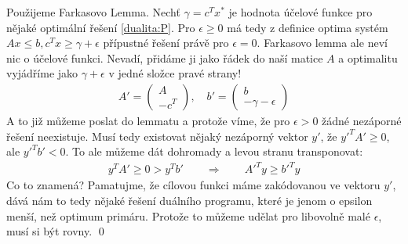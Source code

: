 \dk Použijeme Farkasovo Lemma. Nechť $\gamma = c^Tx^*$ je hodnota účelové funkce
pro nějaké optimální řešení \eqref{dualita:P}. Pro $\epsilon \geq 0$ má tedy z
definice optima systém $Ax \leq b, c^Tx \geq \gamma + \epsilon$ přípustné řešení právě pro
$\epsilon = 0$. Farkasovo lemma ale neví nic o účelové funkci. Nevadí, přidáme
ji jako řádek do naší matice $A$ a optimalitu vyjádříme jako $\gamma + \epsilon$
v jedné složce pravé strany!
\begin{align}
	A' = \left(\begin{array}{c} A \\ -c^T \end{array}\right), \quad b' =
	\left(\begin{array}{c} b \\ -\gamma - \epsilon\end{array}\right)
\end{align}
A to již můžeme poslat do lemmatu a protože víme, že pro $\epsilon > 0$ žádné
nezáporné řešení neexistuje. Musí tedy existovat nějaký nezáporný vektor $y'$, že
$y'^TA' \geq 0$, ale $y'^T b' < 0$. To ale můžeme dát dohromady a levou stranu
transponovat:
\begin{align}
	y^TA' \geq 0 > y^T b' \qquad \Rightarrow \qquad
	A'^Ty \geq b'^T y
\end{align}
Co to znamená? Pamatujme, že cílovou funkci máme zakódovanou ve vektoru
$y'$, dává nám to tedy nějaké řešení duálního programu, které je jenom o epsilon
menší, než optimum primáru. Protože to můžeme udělat pro libovolně malé
$\epsilon$, musí si být rovny. 
\qed

